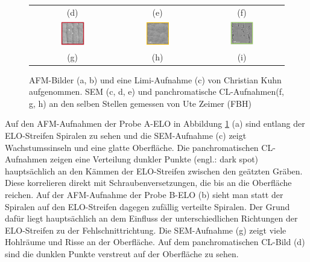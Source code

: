 \begin{figure}[H]
\begin{tabular}{ccc}
(d)  & (e) & (f)   \\[6pt]
\includegraphics[width=0.30\textwidth]{Bilder/TS4045/aELOcl1.png} & \includegraphics[width=0.30\textwidth]{Bilder/TS4045/bELOcl1.png}  & \includegraphics[width=0.30\textwidth]{Bilder/TS4045/cELOcl1.png} \\
(g)  & (h) & (i)   \\[6pt]
\end{tabular}
\caption{AFM-Bilder (a, b) und eine Limi-Aufnahme (c) von Christian Kuhn aufgenommen. SEM (c, d, e) und panchromatische CL-Aufnahmen(f, g, h) an den selben Stellen gemessen von Ute Zeimer (FBH)}
\label{fig:morph1}
\end{figure}
\noindent 
Auf den AFM-Aufnahmen der Probe A-ELO in Abbildung \ref{fig:morph1} (a) sind entlang der ELO-Streifen Spiralen zu sehen und die SEM-Aufnahme (c) zeigt Wachstumssinseln und eine glatte Oberfläche. Die panchromatischen CL-Aufnahmen zeigen eine Verteilung dunkler Punkte (engl.: dark spot) hauptsächlich an den Kämmen der ELO-Streifen zwischen den geätzten Gräben. Diese korrelieren direkt mit Schraubenversetzungen, die bis an die Oberfläche reichen. 
Auf der AFM-Aufnahme der Probe B-ELO (b) sieht man statt der Spiralen auf den ELO-Streifen dagegen zufällig verteilte Spiralen. Der Grund dafür liegt hauptsächlich an dem Einfluss der unterschiedlichen Richtungen der ELO-Streifen zu der Fehlschnittrichtung. Die SEM-Aufnahme (g) zeigt viele Hohlräume und Risse an der Oberfläche. Auf dem panchromatischen CL-Bild (d) sind die dunklen Punkte verstreut auf der Oberfläche zu sehen. 
